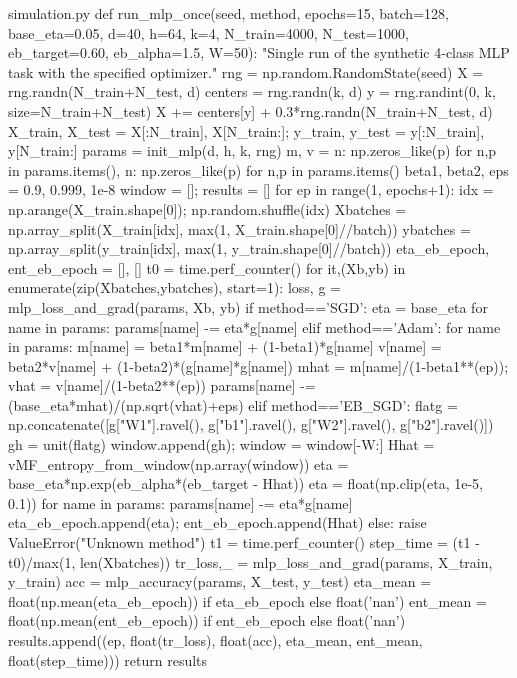 \begin{filecontents*}{simulation.py}
def run_mlp_once(seed, method, epochs=15, batch=128, base_eta=0.05, d=40, h=64, k=4, N_train=4000, N_test=1000,
                 eb_target=0.60, eb_alpha=1.5, W=50):
    "Single run of the synthetic 4-class MLP task with the specified optimizer."
    rng = np.random.RandomState(seed)
    X = rng.randn(N_train+N_test, d)
    centers = rng.randn(k, d)
    y = rng.randint(0, k, size=N_train+N_test)
    X += centers[y] + 0.3*rng.randn(N_train+N_test, d)
    X_train, X_test = X[:N_train], X[N_train:]; y_train, y_test = y[:N_train], y[N_train:]
    params = init_mlp(d, h, k, rng)
    m, v = {n: np.zeros_like(p) for n,p in params.items()}, {n: np.zeros_like(p) for n,p in params.items()}
    beta1, beta2, eps = 0.9, 0.999, 1e-8
    window = []; results = []
    for ep in range(1, epochs+1):
        idx = np.arange(X_train.shape[0]); np.random.shuffle(idx)
        Xbatches = np.array_split(X_train[idx], max(1, X_train.shape[0]//batch))
        ybatches = np.array_split(y_train[idx], max(1, y_train.shape[0]//batch))
        eta_eb_epoch, ent_eb_epoch = [], []
        t0 = time.perf_counter()
        for it,(Xb,yb) in enumerate(zip(Xbatches,ybatches), start=1):
            loss, g = mlp_loss_and_grad(params, Xb, yb)
            if method=='SGD':
                eta = base_eta
                for name in params: params[name] -= eta*g[name]
            elif method=='Adam':
                for name in params:
                    m[name] = beta1*m[name] + (1-beta1)*g[name]
                    v[name] = beta2*v[name] + (1-beta2)*(g[name]*g[name])
                    mhat = m[name]/(1-beta1**(ep)); vhat = v[name]/(1-beta2**(ep))
                    params[name] -= (base_eta*mhat)/(np.sqrt(vhat)+eps)
            elif method=='EB_SGD':
                flatg = np.concatenate([g["W1"].ravel(), g["b1"].ravel(), g["W2"].ravel(), g["b2"].ravel()])
                gh = unit(flatg)
                window.append(gh); window = window[-W:]
                Hhat = vMF_entropy_from_window(np.array(window))
                eta = base_eta*np.exp(eb_alpha*(eb_target - Hhat))
                eta = float(np.clip(eta, 1e-5, 0.1))
                for name in params: params[name] -= eta*g[name]
                eta_eb_epoch.append(eta); ent_eb_epoch.append(Hhat)
            else:
                raise ValueError("Unknown method")
        t1 = time.perf_counter()
        step_time = (t1 - t0)/max(1, len(Xbatches))
        tr_loss,_ = mlp_loss_and_grad(params, X_train, y_train)
        acc = mlp_accuracy(params, X_test, y_test)
        eta_mean = float(np.mean(eta_eb_epoch)) if eta_eb_epoch else float('nan')
        ent_mean = float(np.mean(ent_eb_epoch)) if ent_eb_epoch else float('nan')
        results.append((ep, float(tr_loss), float(acc), eta_mean, ent_mean, float(step_time)))
    return results


\end{filecontents*}
